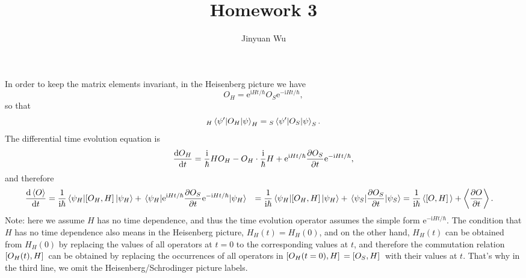 \documentclass[hyperref, a4paper]{article}
\title{Homework 3}
\author{Jinyuan Wu}
\newcommand*{\ii}{\mathrm{i}}
\newcommand*{\ee}{\mathrm{e}}
\def\\{}%
\begin{document}
\maketitle

\section{}

\subsection{}

In order to keep the matrix elements invariant, 
in the Heisenberg picture we have 
\begin{equation}
    O_H = \ee^{\ii H t / \hbar} O_S \ee^{- \ii H t / \hbar}, 
\end{equation}
so that 
\begin{equation}
    {}_H \mel{\psi'}{O_H}{\psi}_H = {}_S \mel{\psi'}{O_S}{\psi}_S.
\end{equation}
The differential time evolution equation is
\begin{equation}
    \dv{O_H}{t} = \frac{\ii}{\hbar} H O_H - O_H \cdot \frac{\ii}{\hbar} H
    + \ee^{\ii H t /\hbar} \pdv{O_S}{t} \ee^{- \ii H t / \hbar},
\end{equation}
and therefore 
\begin{equation}
    \begin{aligned}
        \dv{\expval{O}}{t} &= \frac{1}{\ii \hbar} \expval{\comm*{O_H}{H}}{\psi_H}
        + \expval*{\ee^{\ii H t /\hbar} \pdv{O_S}{t} \ee^{- \ii H t / \hbar}}{\psi_H} \\
        &= \frac{1}{\ii \hbar} \expval{\comm*{O_H}{H}}{\psi_H}
        + \expval*{\pdv{O_S}{t}}{\psi_S} \\
        &= \frac{1}{\ii \hbar} \expval{\comm*{O}{H}} + \expval{\pdv{O}{t}}. 
    \end{aligned}
\end{equation}
Note: here we assume $H$ has no time dependence,
and thus the time evolution operator assumes the simple form $\ee^{- \ii H t / \hbar}$.
The condition that $H$ has no time dependence 
also means in the Heisenberg picture, $H_H(t) = H_H(0)$,
and on the other hand, $H_H(t)$ can be obtained from $H_H(0)$
by replacing the values of all operators at $t = 0$
to the corresponding values at $t$,
and therefore the commutation relation $\comm*{O_H(t)}{H}$
can be obtained by replacing the occurrences of all operators  
in $\comm*{O_H(t=0)}{H} = \comm*{O_S}{H}$
with their values at $t$.
That's why in the third line, 
we omit the Heisenberg/Schrodinger picture labels.
\end{document}
